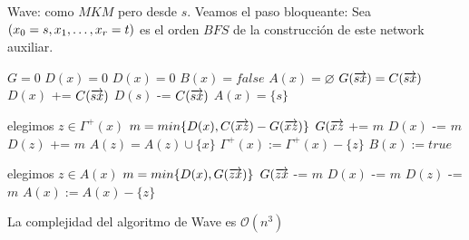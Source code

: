 Wave: como $MKM$ pero desde $s$.
Veamos el paso bloqueante:
Sea $(x_0 = s, x_1, \mathellipsis, x_r = t)$ es el orden $BFS$ de la construcción de este network auxiliar.
\begin{algorithm}
\begin{algorithmic}
\State $G  = 0$
\State $D(x) = 0$ 
\EndFor
{}
\State $D(x) = 0$
\EndFor
{} 
\State $B(x) = false$ 
\State $A(x) = \varnothing$ 
\EndFor
{}
\State $G(\overrightarrow{sx}) = C(\overrightarrow{sx})$
\State $D(x)$ += $C(\overrightarrow{sx})$
\State $D(s)$ -= $C(\overrightarrow{sx})$
\State $A(x) = \{s\}$
\EndFor
{}
 
\EndIf
\EndFor
{} 
\EndIf
\EndFor
\EndWhile
\EndFunction
\end{algorithmic}
\end{algorithm}

\begin{algorithm}
\begin{algorithmic}
\State elegimos $z \in \Gamma^+(x)$
\Else
\State $m = min\{D(x), C(\overrightarrow{xz}) - G(\overrightarrow{xz})\}$
\State $G(\overrightarrow{xz}$ += $m$
\State $D(x)$ -= $m$
\State $D(z)$ += $m$
\State $A(z) = A(z) \cup \{x\}$
\State $\Gamma^+(x) := \Gamma^+(x) - \{z\}$
\EndIf
{}
\State $B(x) := true$
\EndIf
\EndIf
\EndWhile
\EndFunction
\end{algorithmic}
\end{algorithm}

\begin{algorithm}
\begin{algorithmic}
\State elegimos $z \in A(x)$
\State $m = min\{D(x), G(\overrightarrow{zx})\}$
\State $G(\overrightarrow{zx}$ -= $m$
\State $D(x)$ -= $m$
\State $D(z)$ -= $m$
\State $A(x) := A(x) - \{z\}$
\EndIf
\EndWhile
\EndFunction
\end{algorithmic}
\end{algorithm}

\begin{theorem}
La complejidad del algoritmo de Wave es $\mathcal{O}(n^3)$
\end{theorem}

